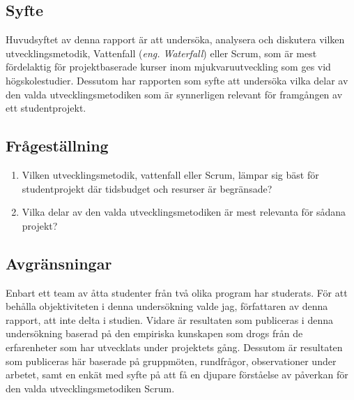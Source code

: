 \subsection{Syfte}
Huvudsyftet av denna rapport är att undersöka, analysera och diskutera vilken utvecklingsmetodik, Vattenfall (\textit{eng. Waterfall}) eller Scrum, som är mest fördelaktig för projektbaserade kurser inom mjukvaruutveckling som ges vid högskolestudier. Dessutom har rapporten som syfte att undersöka vilka delar av den valda utvecklingsmetodiken som är synnerligen relevant för framgången av ett studentprojekt.

\subsection{Frågeställning}
\label{subsec:Lieth_Wahid-research-questions}

\begin{enumerate}
	
	\item Vilken utvecklingsmetodik, vattenfall eller Scrum, lämpar sig bäst för studentprojekt där tidsbudget och resurser är begränsade? \label{LeyQ1}
	
	\item  Vilka delar av den valda utvecklingsmetodiken är mest relevanta för sådana projekt? \label{LeyQ2}
	
\end{enumerate}

\subsection{Avgränsningar}
\label{subsec:Lieth_Wahid-delimitations}
Enbart ett team av åtta studenter från två olika program har studerats. För att behålla objektiviteten i denna undersökning valde jag, författaren av denna rapport, att inte delta i studien. Vidare är resultaten som publiceras i denna undersökning baserad på den empiriska kunskapen som drogs från de erfarenheter som har utvecklats under projektets gång. Dessutom är resultaten som publiceras här baserade på gruppmöten, rundfrågor, observationer under arbetet, samt en enkät med syfte på att få en djupare förståelse av påverkan för den valda utvecklingsmetodiken Scrum. 



